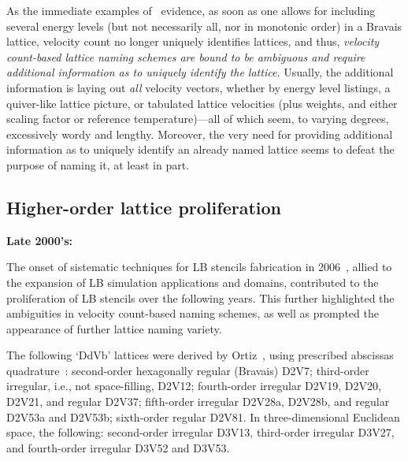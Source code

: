     As the immediate examples of~\cite{2006-PhilippiPC+SurmasR-PhysRevE} evidence, as soon as one allows for  including  several
    energy levels (but not necessarily all, nor in monotonic order) in a Bravais lattice,  velocity  count  no  longer  uniquely
    identifies lattices, and thus, \emph{velocity count-based lattice naming schemes are  bound  to  be  ambiguous  and  require
    additional information as to uniquely identify the lattice.\/} Usually, the additional information is laying out  \emph{all}
    velocity vectors, whether by energy level listings, a quiver-like lattice picture, or  tabulated  lattice  velocities  (plus
    weights, and either scaling factor or reference temperature)---all of which seem, to varying degrees, excessively wordy  and
    lengthy. Moreover, the very need for providing additional information as to uniquely identify an already named lattice seems
    to defeat the purpose of naming it, at least in part.

    \subsection{Higher-order lattice proliferation}


    \vspace{2.0mm}\noindent\textbf{Late 2000's:}\vspace{1.0mm}

    The onset of sistematic techniques  for  LB  stencils  fabrication  in  2006~\cite{2006-ChikatamarlaSS+KarlinIV-PhysRevLett,
    2006-PhilippiPC+SurmasR-PhysRevE, 2006-ShanX+ChenH-JFluidMech}, allied to the expansion of LB  simulation  applications  and
    domains, contributed to the proliferation of LB stencils over the following years. This further highlighted the  ambiguities
    in velocity count-based naming schemes, as well as prompted the appearance of further lattice naming variety.

    The  following  `DdVb'  lattices   were   derived   by   Ortiz~\cite{2007-OrtizCEP-DrUFSC},   using   prescribed   abscissas
    quadrature~\cite{2006-PhilippiPC+SurmasR-PhysRevE}: second-order hexagonally regular (Bravais) D2V7; third-order  irregular,
    i.e., not space-filling, D2V12; fourth-order irregular D2V19, D2V20, D2V21, and regular D2V37; fifth-order irregular D2V28a,
    D2V28b, and regular D2V53a and D2V53b; sixth-order regular D2V81.  In  three-dimensional  Euclidean  space,  the  following:
    second-order irregular D3V13, third-order irregular D3V27, and fourth-order irregular D3V52 and D3V53.


